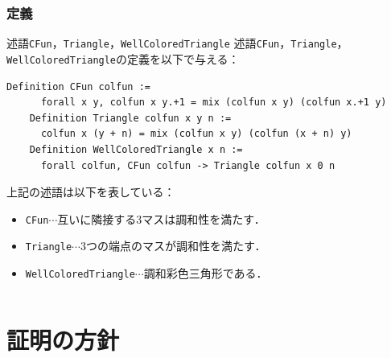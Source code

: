 \documentclass[dvipdfmx,cjk]{beamer}
\begin{document}
\begin{frame}[fragile]
  \frametitle{定義}
  \begin{block}{述語{\tt{CFun}}，{\tt{Triangle}}，{\tt{WellColoredTriangle}}}
    述語{\tt{CFun}}，{\tt{Triangle}}，{\tt{WellColoredTriangle}}の定義を以下で与える：
  \begin{lstlisting}[language=Coq]
    Definition CFun colfun :=
      forall x y, colfun x y.+1 = mix (colfun x y) (colfun x.+1 y)
    Definition Triangle colfun x y n :=
      colfun x (y + n) = mix (colfun x y) (colfun (x + n) y)
    Definition WellColoredTriangle x n :=
      forall colfun, CFun colfun -> Triangle colfun x 0 n
  \end{lstlisting}
  \end{block}
  \vfill
  \begin{minipage}{0.7\hsize}
    上記の述語は以下を表している：
    \begin{itemize}
    \item
      \small
      {\tt{CFun}}$\cdots$互いに隣接する3マスは調和性を満たす．
    \item
      \small
      {\tt{Triangle}}$\cdots$3つの端点のマスが調和性を満たす．
    \item
      \small
      {\tt{WellColoredTriangle}}$\cdots$調和彩色三角形である．
    \end{itemize}
  \end{minipage}
  \begin{minipage}{0.25\hsize}
    \[
    
    \]
  \end{minipage}
  \vfill
\end{frame}

\section{証明の方針}
\end{document}
